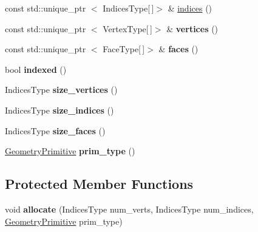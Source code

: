 \begin{DoxyCompactItemize}
\item 
const std\-::unique\-\_\-ptr\*
$<$ \-Indices\-Type\mbox{[}$\,$\mbox{]}$>$ \& \hyperlink{classs9_1_1GeometryT_a74be427b554991e3a771b07c101185f2}{indices} ()
\item 
\hypertarget{classs9_1_1GeometryT_a104153a659fd8f569276138417a92920}{const std\-::unique\-\_\-ptr\*
$<$ \-Vertex\-Type\mbox{[}$\,$\mbox{]}$>$ \& {\bfseries vertices} ()}\label{classs9_1_1GeometryT_a104153a659fd8f569276138417a92920}

\item 
\hypertarget{classs9_1_1GeometryT_ae7aad545bcfcb321bbbed39660876859}{const std\-::unique\-\_\-ptr\*
$<$ \-Face\-Type\mbox{[}$\,$\mbox{]}$>$ \& {\bfseries faces} ()}\label{classs9_1_1GeometryT_ae7aad545bcfcb321bbbed39660876859}

\item 
\hypertarget{classs9_1_1GeometryT_a63255c1b8248a1ce1e3aad9b924d90b6}{bool {\bfseries indexed} ()}\label{classs9_1_1GeometryT_a63255c1b8248a1ce1e3aad9b924d90b6}

\item 
\hypertarget{classs9_1_1GeometryT_a666f3ae798611e54f297508b706c4066}{\-Indices\-Type {\bfseries size\-\_\-vertices} ()}\label{classs9_1_1GeometryT_a666f3ae798611e54f297508b706c4066}

\item 
\hypertarget{classs9_1_1GeometryT_a9633597131fb6d0d3df076680b4b9e1c}{\-Indices\-Type {\bfseries size\-\_\-indices} ()}\label{classs9_1_1GeometryT_a9633597131fb6d0d3df076680b4b9e1c}

\item 
\hypertarget{classs9_1_1GeometryT_a07c1c422288e071f5a104fb54120b4a6}{\-Indices\-Type {\bfseries size\-\_\-faces} ()}\label{classs9_1_1GeometryT_a07c1c422288e071f5a104fb54120b4a6}

\item 
\hypertarget{classs9_1_1GeometryT_a96ccf201495b3e32d62f88745e0b06ce}{\hyperlink{namespaces9_ad57d1332f8fd67d23f6a1d3520ab785c}{\-Geometry\-Primitive} {\bfseries prim\-\_\-type} ()}\label{classs9_1_1GeometryT_a96ccf201495b3e32d62f88745e0b06ce}

\end{DoxyCompactItemize}
\subsection*{\-Protected \-Member \-Functions}
\begin{DoxyCompactItemize}
\item 
\hypertarget{classs9_1_1GeometryT_a832204ccd5846aaecfc1f6bb6df1d8a9}{void {\bfseries allocate} (\-Indices\-Type num\-\_\-verts, \-Indices\-Type num\-\_\-indices, \hyperlink{namespaces9_ad57d1332f8fd67d23f6a1d3520ab785c}{\-Geometry\-Primitive} prim\-\_\-type)}\label{classs9_1_1GeometryT_a832204ccd5846aaecfc1f6bb6df1d8a9}

\end{DoxyCompactItemize}
